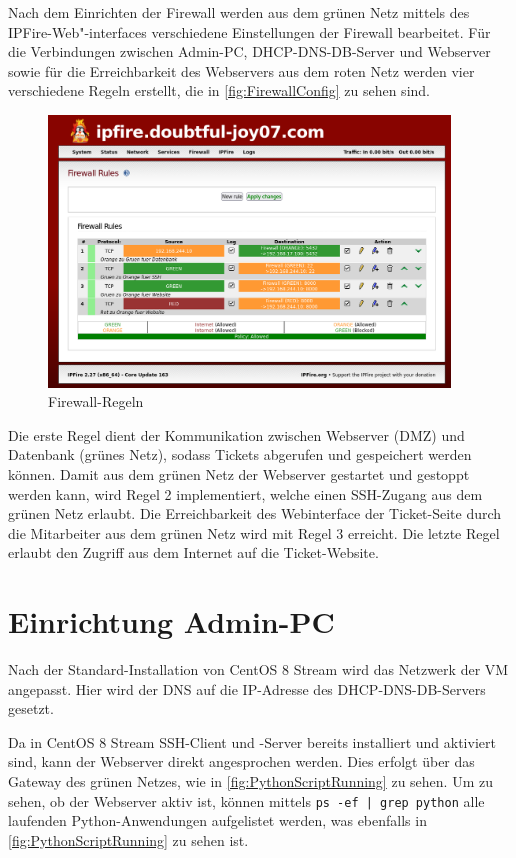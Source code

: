 \documentclass[a4paper,
    11pt,
    headings=small,
    ngerman,
    listof=totoc,
    numbers=noenddot]{scrreprt}[2021/11/13]
\begin{document}
Nach dem Einrichten der Firewall werden aus dem grünen Netz mittels des IPFire-Web"-interfaces verschiedene Einstellungen der Firewall bearbeitet. Für die Verbindungen zwischen Admin-PC, \ac{DHCP}-\ac{DNS}-\ac{DB}-Server und Webserver sowie für die Erreichbarkeit des Webservers aus dem roten Netz werden vier verschiedene Regeln erstellt, die in \vref{fig:FirewallConfig} zu sehen sind.

\begin{figure}[htbp]
  \centering
  \includegraphics[width=0.95\textwidth]{data/ipfire-config.png}
  \caption{Firewall-Regeln}
  \label{fig:FirewallConfig}
\end{figure}

Die erste Regel dient der Kommunikation zwischen Webserver (\ac{DMZ}) und Datenbank (grünes Netz), sodass Tickets abgerufen und gespeichert werden können. Damit aus dem grünen Netz der Webserver gestartet und gestoppt werden kann, wird Regel 2 implementiert, welche einen \ac{SSH}-Zugang aus dem grünen Netz erlaubt. Die Erreichbarkeit des Webinterface der Ticket-Seite durch die Mitarbeiter aus dem grünen Netz wird mit Regel 3 erreicht. Die letzte Regel erlaubt den Zugriff aus dem Internet auf die Ticket-Website.



\section{Einrichtung Admin-PC}

Nach der Standard-Installation von CentOS 8 Stream wird das Netzwerk der \ac{VM} angepasst. Hier wird der \ac{DNS} auf die IP-Adresse des \ac{DHCP}-\ac{DNS}-\ac{DB}-Servers gesetzt.

Da in CentOS 8 Stream \ac{SSH}-Client und -Server bereits installiert und aktiviert sind, kann der Webserver direkt angesprochen werden. Dies erfolgt über das Gateway des grünen Netzes, wie in \vref{fig:PythonScriptRunning} zu sehen. Um zu sehen, ob der Webserver aktiv ist, können mittels \texttt{ps -ef | grep python} alle laufenden Python-Anwendungen aufgelistet werden, was ebenfalls in \vref{fig:PythonScriptRunning} zu sehen ist.
\end{document}
